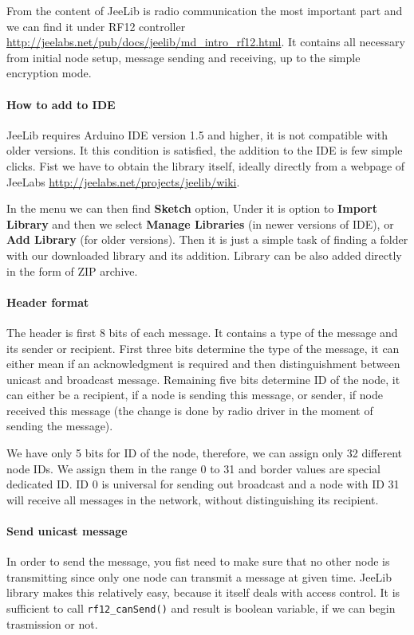 \documentclass[12pt,titlepage]{article}
\begin{document}
    From the content of JeeLib is radio communication the most important part and we can find it under RF12 controller \url{http://jeelabs.net/pub/docs/jeelib/md_intro_rf12.html}. It contains all necessary from initial node setup, message sending and receiving, up to the simple encryption mode.

        \paragraph{How to add to IDE}
        JeeLib requires Arduino IDE version 1.5 and higher, it is not compatible with older versions. It this condition is satisfied, the addition to the IDE is few simple clicks. Fist we have to obtain the library itself, ideally directly from a webpage of JeeLabs \url{http://jeelabs.net/projects/jeelib/wiki}.

        In the menu we can then find \textbf{Sketch} option, Under it is option to \textbf{Import Library} and then we select \textbf{Manage Libraries} (in newer versions of IDE), or \textbf{Add Library} (for older versions). Then it is just a simple task of finding a folder with our downloaded library and its addition. Library can be also added directly in the form of ZIP archive.

        \paragraph{Header format}
        The header is first 8 bits of each message. It contains a type of the message and its sender or recipient. First three bits determine the type of the message, it can either mean if an acknowledgment is required and then distinguishment between unicast and broadcast message. Remaining five bits determine ID of the node, it can either be a recipient, if a node is sending this message, or sender, if node received this message (the change is done by radio driver in the moment of sending the message).

        We have only 5 bits for ID of the node, therefore, we can assign only 32 different node IDs. We assign them in the range 0 to 31 and border values are special dedicated ID. ID 0 is universal for sending out broadcast and a node with ID 31 will receive all messages in the network, without distinguishing its recipient.

        \paragraph{Send unicast message}
        In order to send the message, you fist need to make sure that no other node is transmitting since only one node can transmit a message at given time. JeeLib library makes this relatively easy, because it itself deals with access control.
        It is sufficient to call \texttt{rf12\_canSend()} and result is boolean variable, if we can begin trasmission or not.
\end{document}
